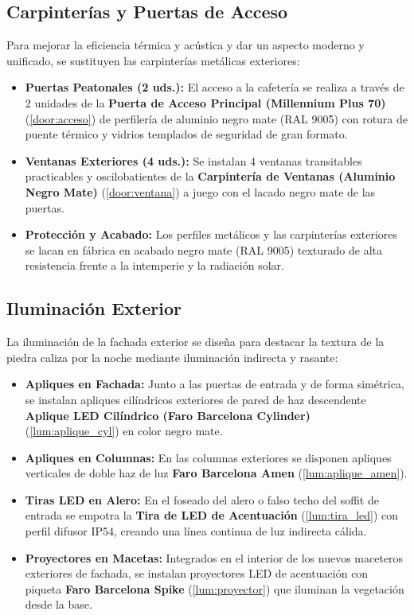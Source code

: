 \subsection{Carpinterías y Puertas de Acceso}
Para mejorar la eficiencia térmica y acústica y dar un aspecto moderno y unificado, se sustituyen las carpinterías metálicas exteriores:
\begin{itemize}
    \item \textbf{Puertas Peatonales (2 uds.):} El acceso a la cafetería se realiza a través de 2 unidades de la \textbf{Puerta de Acceso Principal (Millennium Plus 70)} (\ref{door:acceso}) de perfilería de aluminio negro mate (RAL 9005) con rotura de puente térmico y vidrios templados de seguridad de gran formato.
    \item \textbf{Ventanas Exteriores (4 uds.):} Se instalan 4 ventanas transitables practicables y oscilobatientes de la \textbf{Carpintería de Ventanas (Aluminio Negro Mate)} (\ref{door:ventana}) a juego con el lacado negro mate de las puertas.
    \item \textbf{Protección y Acabado:} Los perfiles metálicos y las carpinterías exteriores se lacan en fábrica en acabado negro mate (RAL 9005) texturado de alta resistencia frente a la intemperie y la radiación solar.
\end{itemize}

\subsection{Iluminación Exterior}
La iluminación de la fachada exterior se diseña para destacar la textura de la piedra caliza por la noche mediante iluminación indirecta y rasante:
\begin{itemize}
    \item \textbf{Apliques en Fachada:} Junto a las puertas de entrada y de forma simétrica, se instalan apliques cilíndricos exteriores de pared de haz descendente \textbf{Aplique LED Cilíndrico (Faro Barcelona Cylinder)} (\ref{lum:aplique_cyl}) en color negro mate.
    \item \textbf{Apliques en Columnas:} En las columnas exteriores se disponen apliques verticales de doble haz de luz \textbf{Faro Barcelona Amen} (\ref{lum:aplique_amen}).
    \item \textbf{Tiras LED en Alero:} En el foseado del alero o falso techo del soffit de entrada se empotra la \textbf{Tira de LED de Acentuación} (\ref{lum:tira_led}) con perfil difusor IP54, creando una línea continua de luz indirecta cálida.
    \item \textbf{Proyectores en Macetas:} Integrados en el interior de los nuevos maceteros exteriores de fachada, se instalan proyectores LED de acentuación con piqueta \textbf{Faro Barcelona Spike} (\ref{lum:proyector}) que iluminan la vegetación desde la base.
\end{itemize}

